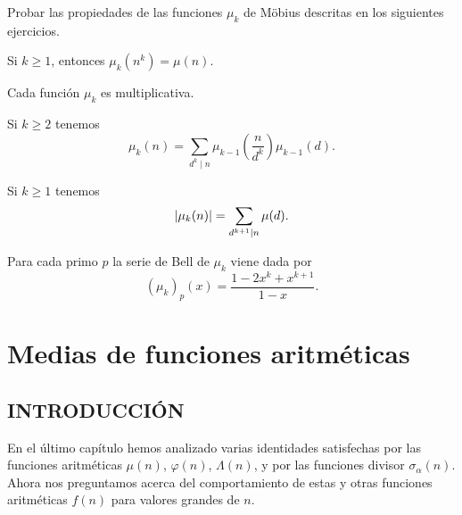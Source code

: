 \documentclass[12pt,a4paper]{book}
\begin{document}
    Probar las propiedades de las funciones $\mu_k$ de Möbius descritas en los siguientes
    ejercicios.

    \begin{ejercicio}
        Si $k\geq1$, entonces $\mu_k(n^k)=\mu(n)$.
    \end{ejercicio}

    \begin{ejercicio}
        Cada función $\mu_k$ es multiplicativa.
    \end{ejercicio}

    \begin{ejercicio}
        Si $k\geq2$ tenemos
        \begin{equation*}
            \mu_k(n)=\sum_{d^k\mid n}\mu_{k-1}\left(\frac{n}{d^k}\right)\mu_{k-1}(d).
        \end{equation*}
    \end{ejercicio}

    \begin{ejercicio}
        Si $k\geq1$ tenemos
        \begin{equation*}
            \abs{\mu_k(n)}=\sum_{d^{k+1}\mid n}\mu(d).
        \end{equation*}
    \end{ejercicio}

    \begin{ejercicio}
        Para cada primo $p$ la serie de Bell de $\mu_k$ viene dada por
        \begin{equation*}
            (\mu_k)_p(x)=\frac{1-2x^k+x^{k+1}}{1-x}.
        \end{equation*}
    \end{ejercicio}

\chapter{Medias de funciones aritméticas}

    \section{INTRODUCCIÓN}

    En el último capítulo hemos analizado varias identidades satisfechas por las funciones
    aritméticas $\mu(n)$, $\varphi(n)$, $\Lambda(n)$, y por las funciones divisor
    $\sigma_\alpha(n)$. Ahora nos preguntamos acerca del comportamiento de estas y otras
    funciones aritméticas $f(n)$ para valores grandes de $n$.
\end{document}
